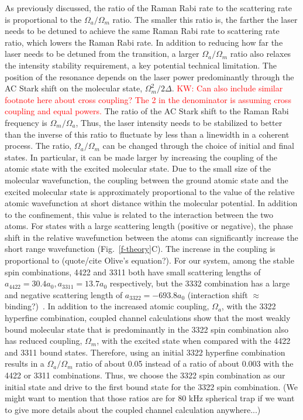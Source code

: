 \documentclass[aps,prl,twocolumn,groupedaddress]{revtex4-1}
\begin{document}
As previously discussed, the ratio of the Raman Rabi rate to the scattering rate is proportional to the $ \Omega_a/\Omega_m $ ratio. The smaller this ratio is, the farther the laser needs to be detuned to achieve the same Raman Rabi rate to scattering rate ratio, which lowers the Raman Rabi rate. In addition to reducing how far the laser needs to be detuned from the transition, a larger $ \Omega_a/\Omega_m$ ratio also relaxes the intensity stability requirement, a key potential technical limitation. The position of the resonance depends on the laser power predominantly through the AC Stark shift on the molecular state, $ \Omega_m^2 / 2\Delta $. \textcolor{red}{KW: Can also include similar footnote here about cross coupling? The 2 in the denominator is assuming cross coupling and equal powers.} The ratio of the AC Stark shift to the Raman Rabi frequency is $ \Omega_m / \Omega_a $, Thus, the laser intensity needs to be stabilized to better than the inverse of this ratio to fluctuate by less than a linewidth in a coherent process. The ratio, $ \Omega_a/\Omega_m $ can be changed through the choice of initial and final states. In particular, it can be made larger by increasing the coupling of the atomic state with the excited molecular state. Due to the small size of the molecular wavefunction, the coupling between the ground atomic state and the excited molecular state is approximately proportional to the value of the relative atomic wavefunction at short distance within the molecular potential. In addition to the confinement, this value is related to the interaction between the two atoms. For states with a large scattering length (positive or negative), the phase shift in the relative wavefunction between the atoms can significantly increase the short range wavefunction (Fig.~\ref{f-theory}C). The increase in the coupling is proportional to (quote/cite Olive's equation?). For our system, among the stable spin combinations, 4422 and 3311 both have small scattering lengths of $ a_{4422}= 30.4a_0, a_{3311} = 13.7a_0 $ respectively, but the 3332 combination has a large and negative scattering length of $ a_{3322} = -693.8a_0 $ (interaction shift $\approx$ binding?)~\cite{Hood2019}. In addition to the increased atomic coupling, $ \Omega_a $, with the 3322 hyperfine combination, coupled channel calculations show that the most weakly bound molecular state that is predominantly in the 3322 spin combination also has reduced coupling, $ \Omega_m $, with the excited state when compared with the 4422 and 3311 bound states. Therefore, using an initial 3322 hyperfine combination results in a $ \Omega_a/\Omega_m$ ratio of about 0.05 instead of a ratio of about 0.003 with the 4422 or 3311 combinations. 
Thus, we choose the 3322 spin combination as our initial state and drive to the first bound state for the 3322 spin combination. (We might want to mention that those ratios are for 80 kHz spherical trap if we want to give more details about the coupled channel calculation anywhere...)
\end{document}
